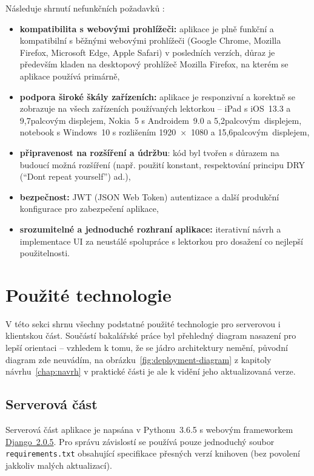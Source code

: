 Následuje shrnutí nefunkčních požadavků \cite{bp}:
\begin{itemize}
    \item \textbf{kompatibilita s webovými prohlížeči:} aplikace je plně funkční a kompatibilní s běžnými webovými prohlížeči (Google Chrome, Mozilla Firefox, Microsoft Edge, Apple Safari) v posledních verzích, důraz je především kladen na desktopový prohlížeč Mozilla Firefox, na kterém se aplikace používá primárně,
    \item \textbf{podpora široké škály zařízeních:} aplikace je responzivní a korektně se zobrazuje na všech zařízeních používaných lektorkou -- iPad s iOS~13.3 a 9,7palcovým displejem, Nokia~5 s Androidem~9.0 a 5,2palcovým~displejem, notebook s Windows~10 s rozlišením 1920~×~1080 a 15,6palcovým~displejem,
    \item \textbf{připravenost na rozšíření a údržbu}: kód byl tvořen s důrazem na budoucí možná rozšíření (např. použití konstant, respektování principu DRY (\enquote{Don\textquotesingle t repeat yourself}) ad.),
    \item \textbf{bezpečnost:} JWT (JSON Web Token) autentizace a další produkční konfigurace pro zabezpečení aplikace,
    \item \textbf{srozumitelné a jednoduché rozhraní aplikace:} iterativní návrh a implementace UI za neustálé spolupráce s lektorkou pro dosažení co nejlepší použitelnosti.
\end{itemize}


\section{Použité technologie}

V této sekci shrnu všechny podstatné použité technologie pro serverovou i klientskou část. Součástí bakalářské práce byl přehledný diagram nasazení pro lepší orientaci \cite{bp} -- vzhledem k tomu, že se jádro architektury nemění, původní diagram zde neuvádím, na obrázku~\ref{fig:deployment-diagram} z kapitoly návrhu~\ref{chap:navrh} v praktické části je ale k vidění jeho aktualizovaná verze.

\subsection{Serverová část}

Serverová část aplikace \cite{bp} je napsána v Pythonu~3.6.5 s webovým frameworkem \href{https://www.djangoproject.com/}{Django~2.0.5}. Pro správu závislostí se používá pouze jednoduchý soubor \verb|requirements.txt| obsahující specifikace přesných verzí knihoven (bez povolení jakkoliv malých aktualizací). 

